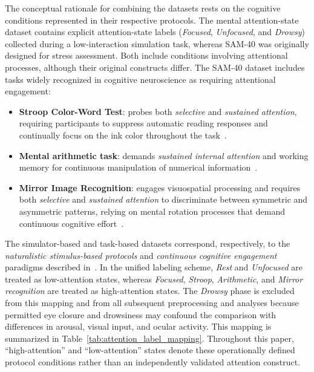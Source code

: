 \documentclass[10pt,letterpaper]{article}
\newcommand{\rev}[1]{#1}
\begin{document}
The conceptual rationale for combining the datasets rests on the cognitive conditions represented in their respective protocols. The mental attention-state dataset contains explicit attention-state labels (\textit{Focused}, \textit{Unfocused}, and \textit{Drowsy}) collected during a low-interaction simulation task, whereas SAM-40 was originally designed for stress assessment. Both include conditions involving attentional processes, although their original constructs differ. The SAM-40 dataset includes tasks widely recognized in cognitive neuroscience as requiring attentional engagement:
\begin{itemize}
    \item \textbf{Stroop Color-Word Test}: probes both \textit{selective} and \textit{sustained attention}, requiring participants to suppress automatic reading responses and continually focus on the ink color throughout the task~\cite{macleod1991stroop, scarpina2017stroop, esterman2013zone}.
    \item \textbf{Mental arithmetic task}: demands \textit{sustained internal attention} and working memory for continuous manipulation of numerical information~\cite{grabner2007math, kitaura2017functional}.
    \item \textbf{Mirror Image Recognition}: engages visuospatial processing and requires both \textit{selective} and \textit{sustained attention} to discriminate between symmetric and asymmetric patterns, relying on mental rotation processes that demand continuous cognitive effort~\cite{shepard1971mental, hyun2007visual, tomasino2016mental}.
\end{itemize}

The simulator-based and task-based datasets correspond, respectively, to the \textit{naturalistic stimulus-based protocols} and \textit{continuous cognitive engagement} paradigms described in~\cite{chen2025hybrid}. In the unified labeling scheme, \textit{Rest} and \textit{Unfocused} are treated as low-attention states, whereas \textit{Focused}, \textit{Stroop}, \textit{Arithmetic}, and \textit{Mirror recognition} are treated as high-attention states. The \textit{Drowsy} phase is excluded from this mapping and from all subsequent preprocessing and analyses because permitted eye closure and drowsiness may confound the comparison with differences in arousal, visual input, and ocular activity. This mapping is summarized in Table~\ref{tab:attention_label_mapping}. \rev{Throughout this paper, ``high-attention'' and ``low-attention'' states denote these operationally defined protocol conditions rather than an independently validated attention construct.}
\end{document}
